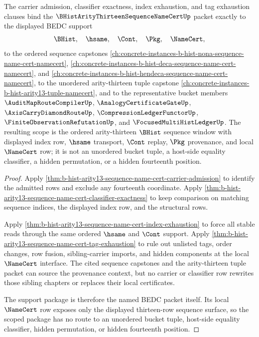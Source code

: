 \begin{theorem}
\label{thm:b-hist-arity13-sequence-name-cert-scoped-support-package}
The carrier admission, classifier exactness, index exhaustion, and tag exhaustion clauses bind the $\BHistArityThirteenSequenceNameCertUp$ packet exactly to the displayed BEDC support
$$
\BHist,\quad \hsame,\quad \Cont,\quad \Pkg,\quad \NameCert,
$$
to the ordered sequence capstones \autoref{ch:concrete-instances-b-hist-nona-sequence-name-cert-namecert}, \autoref{ch:concrete-instances-b-hist-deca-sequence-name-cert-namecert}, and \autoref{ch:concrete-instances-b-hist-hendeca-sequence-name-cert-namecert}, to the unordered arity-thirteen tuple capstone \autoref{ch:concrete-instances-b-hist-arity13-tuple-namecert}, and to the representative bucket members $\AuditMapRouteCompilerUp$, $\AnalogyCertificateGateUp$, $\AxisCarryDiamondRouteUp$, $\CompressionLedgerFunctorUp$, $\FiniteObservationRefutationUp$, and $\FocusedMultiHistLedgerUp$. The resulting scope is the ordered arity-thirteen $\BHist$ sequence window with displayed index row, $\hsame$ transport, $\Cont$ replay, $\Pkg$ provenance, and local $\NameCert$ row; it is not an unordered bucket tuple, a host-side equality classifier, a hidden permutation, or a hidden fourteenth position.
\end{theorem}
\begin{proof}
Apply \autoref{thm:b-hist-arity13-sequence-name-cert-carrier-admission} to identify the admitted rows and exclude any fourteenth coordinate. Apply \autoref{thm:b-hist-arity13-sequence-name-cert-classifier-exactness} to keep comparison on matching sequence indices, the displayed index row, and the structural rows.

Apply \autoref{thm:b-hist-arity13-sequence-name-cert-index-exhaustion} to force all stable reads through the same ordered $\hsame$ and $\Cont$ support. Apply \autoref{thm:b-hist-arity13-sequence-name-cert-tag-exhaustion} to rule out unlisted tags, order changes, row fusion, sibling-carrier imports, and hidden components at the local $\NameCert$ interface. The cited sequence capstones and the arity-thirteen tuple packet can source the provenance context, but no carrier or classifier row rewrites those sibling chapters or replaces their local certificates.

The support package is therefore the named BEDC packet itself. Its local $\NameCert$ row exposes only the displayed thirteen-row sequence surface, so the scoped package has no route to an unordered bucket tuple, host-side equality classifier, hidden permutation, or hidden fourteenth position.
\end{proof}

